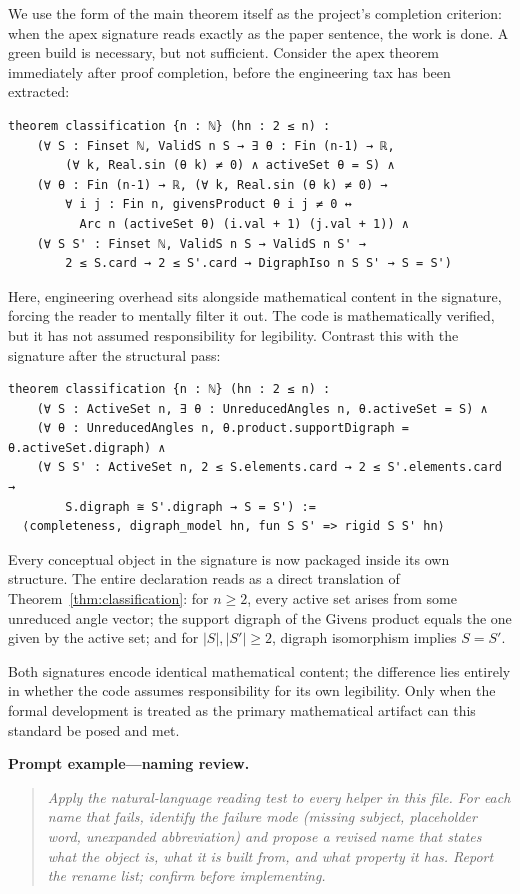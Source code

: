 We use the form of the main theorem itself as the project's completion 
criterion: when the apex signature reads exactly as the paper sentence, 
the work is done. A green build is necessary, but not sufficient. Consider the apex theorem immediately after proof completion, before the 
engineering tax has been extracted:
\begin{lstlisting}
theorem classification {n : ℕ} (hn : 2 ≤ n) :
    (∀ S : Finset ℕ, ValidS n S → ∃ θ : Fin (n-1) → ℝ,
        (∀ k, Real.sin (θ k) ≠ 0) ∧ activeSet θ = S) ∧
    (∀ θ : Fin (n-1) → ℝ, (∀ k, Real.sin (θ k) ≠ 0) →
        ∀ i j : Fin n, givensProduct θ i j ≠ 0 ↔
          Arc n (activeSet θ) (i.val + 1) (j.val + 1)) ∧
    (∀ S S' : Finset ℕ, ValidS n S → ValidS n S' →
        2 ≤ S.card → 2 ≤ S'.card → DigraphIso n S S' → S = S')
\end{lstlisting}
Here, engineering overhead sits alongside mathematical content in the
signature, forcing the reader to mentally filter it out. The code is 
mathematically verified, but it has not assumed responsibility for legibility. Contrast this with the signature after the structural pass:
\begin{lstlisting}
theorem classification {n : ℕ} (hn : 2 ≤ n) :
    (∀ S : ActiveSet n, ∃ θ : UnreducedAngles n, θ.activeSet = S) ∧
    (∀ θ : UnreducedAngles n, θ.product.supportDigraph = θ.activeSet.digraph) ∧
    (∀ S S' : ActiveSet n, 2 ≤ S.elements.card → 2 ≤ S'.elements.card →
        S.digraph ≅ S'.digraph → S = S') :=
  ⟨completeness, digraph_model hn, fun S S' => rigid S S' hn⟩
\end{lstlisting}
Every conceptual object in the signature is now packaged inside its own
structure. The entire declaration reads as a direct translation of
Theorem~\ref{thm:classification}: for $n \ge 2$, every active set
arises from some unreduced angle vector; the support digraph of the
Givens product equals the one given by the active set; and for
$|S|, |S'| \ge 2$, digraph isomorphism implies $S = S'$.

Both signatures encode identical mathematical content; the difference
lies entirely in whether the code assumes responsibility for its own legibility. 
Only when the formal development is treated as the primary mathematical 
artifact can this standard be posed and met.

\medskip
\noindent\textbf{Prompt example---naming review.}
\begin{quote}\itshape\small
Apply the natural-language reading test to every helper in this file.
For each name that fails, identify the failure mode (missing subject,
placeholder word, unexpanded abbreviation) and propose a revised name
that states what the object is, what it is built from, and what
property it has. Report the rename list; confirm before implementing.
\end{quote}
